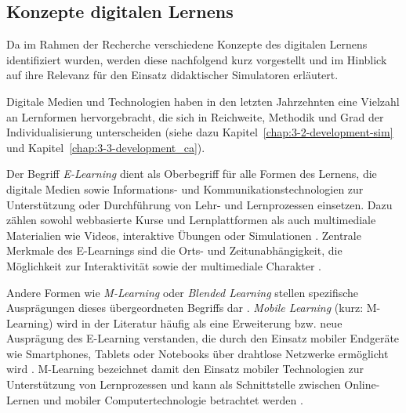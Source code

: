\subsection{Konzepte digitalen Lernens}

Da im Rahmen der Recherche verschiedene Konzepte des digitalen Lernens identifiziert wurden, werden diese nachfolgend kurz vorgestellt und im Hinblick auf ihre Relevanz für den Einsatz didaktischer Simulatoren erläutert.

Digitale Medien und Technologien haben in den letzten Jahrzehnten eine Vielzahl an Lernformen hervorgebracht, die sich in Reichweite, Methodik und Grad der Individualisierung unterscheiden (siehe dazu Kapitel~\ref{chap:3-2-development-sim} und Kapitel~\ref{chap:3-3-development_ca}).

Der Begriff \textit{E-Learning} dient als Oberbegriff für alle Formen des Lernens, die digitale Medien sowie Informations- und Kommunikationstechnologien zur Unterstützung oder Durchführung von Lehr- und Lernprozessen einsetzen. Dazu zählen sowohl webbasierte Kurse und Lernplattformen als auch multimediale Materialien wie Videos, interaktive Übungen oder Simulationen \parencite[S.~6]{kerres_mediendidaktik_2018}. Zentrale Merkmale des E-Learnings sind die Orts- und Zeitunabhängigkeit, die Möglichkeit zur Interaktivität sowie der multimediale Charakter \parencite[S.~186f]{sanderson_e-learning_2002}. 

Andere Formen wie \textit{M-Learning} oder \textit{Blended Learning} stellen spezifische Ausprägungen dieses übergeordneten Begriffs dar \parencites[S.~74]{magenheim_blended_2003}[S.~3]{balaji_perspective_2016}. \textit{Mobile Learning} (kurz: M-Learning) wird in der Literatur häufig als eine Erweiterung bzw. neue Ausprägung des E-Learning verstanden, die durch den Einsatz mobiler Endgeräte wie Smartphones, Tablets oder Notebooks über drahtlose Netzwerke ermöglicht wird \parencites[S.~3f]{balaji_perspective_2016}[S.~197]{basak_kumar_e-learning_2018}. M-Learning bezeichnet damit den Einsatz mobiler Technologien zur Unterstützung von Lernprozessen und kann als Schnittstelle zwischen Online-Lernen und mobiler Computertechnologie betrachtet werden \parencite[S.~265]{traxler_defining_2005}.

